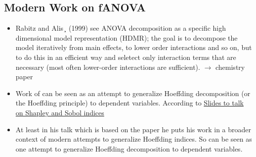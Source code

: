 \subsection{Modern Work on fANOVA}
\begin{itemize}
    \item Rabitz and Alis¸ (1999) see ANOVA decomposition as a specific high dimensional model representation (HDMR); the goal is to decompose the model iteratively from main effects, to lower order interactions and so on, but to do this in an efficient way and seletect only interaction terms that are necessary (most often lower-order interactions are sufficient). $\rightarrow$ chemistry paper
    \item Work of \cite{hooker2007} can be seen as an attempt to generalize Hoeffding decomposition (or the Hoeffding principle) to dependent variables. According to \href{https://static1.squarespace.com/static/5f704d21e5464d602d153738/t/66ec27cadf4e8d42ed9018d0/1726752718798/20240918_SADiscord_MIL.pdf}{Slides to talk on Shapley and Sobol indices}
    \item At least in his talk which is based on the paper \cite{ilidrissi2025} he puts his work in a broader context of modern attempts to generalize Hoeffding indices. So \cite{ilidrissi2025} can be seen as one attempt to generalize Hoeffding decomposition to dependent variables.
\end{itemize}


